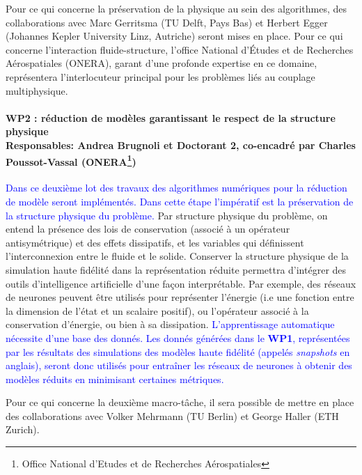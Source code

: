 \documentclass[12pt, french]{article}
\newcommand{\review}[1]{\textcolor{blue}{#1}}
\begin{document}
	Pour ce qui concerne la préservation de la physique au sein des algorithmes, des collaborations avec Marc Gerritsma (TU Delft, Pays Bas) et Herbert Egger (Johannes Kepler University Linz, Autriche) seront mises en place. Pour ce qui concerne l'interaction fluide-structure, l'office National d'Études et de Recherches Aérospatiales (ONERA), garant d'une profonde expertise en ce domaine, représentera l'interlocuteur principal pour les problèmes liés au couplage multiphysique.
	
	\paragraph[\large WP2 : réduction de modèles garantissant le respect de la structure physique\\
	Responsables: Andrea Brugnoli et Doctorant 2, co-encadré par Charles Poussot-Vassal (ONERA)]{\large WP2 : réduction de modèles garantissant le respect de la structure physique\\
		Responsables: Andrea Brugnoli et Doctorant 2, co-encadré par Charles Poussot-Vassal (ONERA\footnote{Office National d'Etudes et de Recherches Aérospatiales})\\}
	
	\review{Dans ce deuxième lot des travaux des algorithmes numériques pour la réduction de modèle seront implémentés. Dans cette étape l'impératif est la préservation de la structure physique du problème.}
	Par structure physique du problème, on entend la présence des lois de conservation (associé à un opérateur antisymétrique) et des effets dissipatifs, et les variables qui définissent l'interconnexion entre le fluide et le solide. Conserver la structure physique de la simulation haute fidélité dans la représentation réduite permettra d'intégrer des outils d'intelligence artificielle d'une façon interprétable. Par exemple, des réseaux de neurones peuvent être utilisés pour représenter l'énergie (i.e une fonction entre la dimension de l'état et un scalaire positif), ou l'opérateur associé à la conservation d'énergie, ou bien à sa dissipation. \review{L'apprentissage automatique nécessite d'une base des donnés. Les donnés générées dans le \textbf{WP1}, représentées par les résultats des simulations des modèles haute fidélité (appelés \textit{snapshots} en anglais), seront donc utilisés pour entraîner les réseaux de neurones à obtenir des modèles réduits en minimisant certaines métriques.}
	
	Pour ce qui concerne la deuxième macro-tâche, il sera possible de mettre en place des collaborations avec Volker Mehrmann (TU Berlin) et George Haller (ETH Zurich).
	
\end{document}
